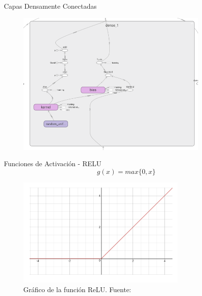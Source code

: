 \documentclass[10pt]{beamer}
\begin{document}
\begin{frame}{Capas Densamente Conectadas}
    \begin{figure}[!ht] 
        \centering
        \includegraphics[width=0.85\textwidth]{../img/densetf}
    \end{figure}
\end{frame}

\begin{frame}{Funciones de Activación - RELU}
    \begin{equation}\label{eq:relu}
        g(x) = max\{0,x\}
    \end{equation}

    \begin{figure}[!h] 
        \centering
        \includegraphics[width=0.75\textwidth]{../img/relu}
        \caption[Gráfico de la función ReLU]{Gráfico de la función ReLU. Fuente: \cite{wang_2016} }
    \end{figure}
\end{frame}
\end{document}
